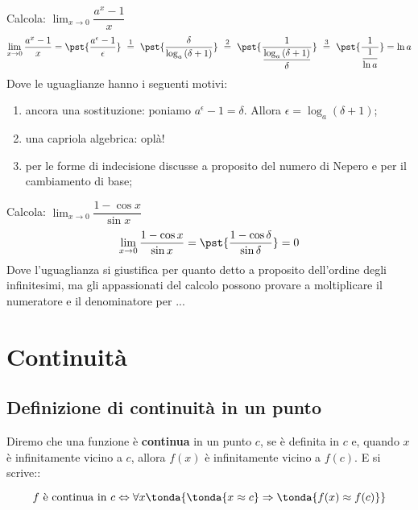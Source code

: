 \begin{esempio}
Calcola: \quad 
  \(\displaystyle \lim_{x \rightarrow 0} \dfrac{a^x-1}{x}\)
\begin{align*}
\lim_{x \rightarrow 0} \dfrac{a^x-1}{x} =
\pst{\dfrac{a^\epsilon-1}{\epsilon}}
~ \stackrel{1}{=} ~  
\pst{\dfrac{\delta}{\log_a{(\delta+1)}}}
~ \stackrel{2}{=} ~
\pst{\frac{1}{\dfrac{\log_a{(\delta+1)}}{\delta}}}
~ \stackrel{3}{=} ~ 
\pst{\frac{1}{\dfrac{1}{\ln{a}}}}=\ln{a}
\end{align*}
Dove le uguaglianze hanno i seguenti motivi:
\begin{enumerate} [nosep]
 \item ancora una sostituzione: poniamo
$a^\epsilon-1=\delta$. Allora $\epsilon=\log_a(\delta+1)$;
 \item una capriola algebrica: oplà! 
 \item per le forme di indecisione discusse a proposito del numero di Nepero
e per il cambiamento di base;
\end{enumerate}
\end{esempio}

\begin{esempio}
Calcola: \quad 
  \(\displaystyle \lim_{x \rightarrow 0} \dfrac{1-\cos x}{\sin x}\)
\[\lim_{x \rightarrow 0} \dfrac{1-\cos x}{\sin x} =
  \pst{\dfrac{1-\cos \delta}{\sin \delta}}=0\]
Dove l'uguaglianza si giustifica per quanto detto a proposito dell'ordine 
degli infinitesimi, ma gli appassionati del calcolo possono provare a 
moltiplicare il numeratore e il denominatore per ...
\end{esempio}



\section{Continuità}
\label{sec:cont_continuita}

\subsection{Definizione di continuità in un punto}
\label{subsec:cont_definizione}


\begin{definizione}
Diremo che una funzione è \textbf{continua} in un punto \(c\), 
se è definita in \(c\) e, 
quando \(x\) è infinitamente vicino a \(c\), 
allora \(f(x)\) è infinitamente vicino a \(f(c)\). E si scrive::

\[f \text{ è continua in } c \Leftrightarrow 
\forall x \tonda{\tonda{x \approx c} \Rightarrow 
\tonda{f(x) \approx f(c)}}\]

\end{definizione}

